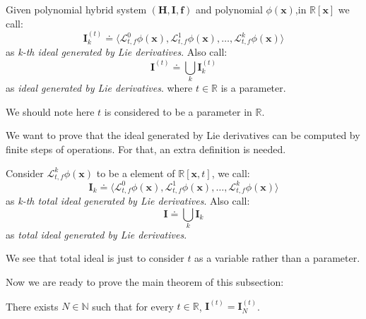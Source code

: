 \documentclass{article}
\begin{document}
\begin{Definition}
\label{def:lieIdeal}
Given polynomial hybrid system $(\boldsymbol{H}, \boldsymbol{I}, \boldsymbol{f})$ and polynomial $\phi(\boldsymbol{x})$,in $\mathbb{R}[\boldsymbol{x}]$ we call: 
		\begin{equation*}
			\boldsymbol{I}_k^{(t)} \doteq \langle \mathcal{L}_{t, f}^0 \phi(\boldsymbol{x}), \mathcal{L}_{t, f}^1 \phi(\boldsymbol{x}), \dots, \mathcal{L}_{t, f}^k \phi(\boldsymbol{x}) \rangle
		\end{equation*}
		as \emph{k-th ideal generated by Lie derivatives}. Also call: 
		\begin{equation*}
			\boldsymbol{I}^{(t)} \doteq \bigcup_k \boldsymbol{I}_k^{(t)}
		\end{equation*}
		as \emph{ideal generated by Lie derivatives}. where $t \in \mathbb{R}$ is a parameter.
\end{Definition}
We should note here $t$ is considered to be a parameter in $\mathbb{R}$.

We want to prove that the ideal generated by Lie derivatives can be computed by finite steps of operations. For that, an extra definition is needed. 

\begin{Definition}
\label{def:lieTot}
Consider $\mathcal{L}_{t, f}^k \phi(\boldsymbol{x})$ to be a element of $\mathbb{R}[\boldsymbol{x}, t]$, we call: 
	\begin{equation*}
		\boldsymbol{I}_k \doteq \langle \mathcal{L}_{t, f}^0 \phi(\boldsymbol{x}), \mathcal{L}_{t, f}^1 \phi(\boldsymbol{x}), \dots, \mathcal{L}_{t, f}^k \phi(\boldsymbol{x}) \rangle
	\end{equation*}	
	as \emph{k-th total ideal generated by Lie derivatives}. Also call:
	\begin{equation*}
		\boldsymbol{I} \doteq \bigcup_k \boldsymbol{I}_k
	\end{equation*}
	as \emph{total ideal generated by Lie derivatives}.
\end{Definition}

We see that total ideal is just to consider $t$ as a variable rather than a parameter.

Now we are ready to prove the main theorem of this subsection: 
\begin{Theorem}
\label{thm:lieIdeal}
There exists $N \in \mathbb{N}$ such that for every $t \in \mathbb{R}$, $\boldsymbol{I}^{(t)} = \boldsymbol{I}_N^{(t)}$.
\end{Theorem}
\end{document}
